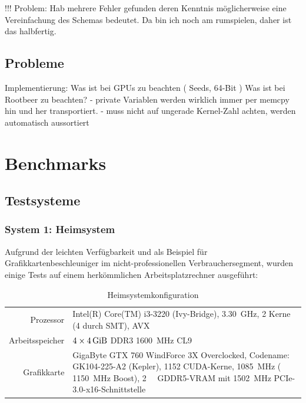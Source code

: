 \documentclass[german,bibnum,beleg,zihtitle,german,hyperref,utf8]{zihpub}
\begin{document}
!!! Problem: Hab mehrere Fehler gefunden deren Kenntnis möglicherweise eine Vereinfachung des Schemas bedeutet. Da bin ich noch am rumspielen, daher ist das halbfertig.

\section{Probleme}
Implementierung:
    Was ist bei GPUs zu beachten ( Seeds, 64-Bit )
    Was ist bei Rootbeer zu beachten?
      - private Variablen werden wirklich immer per memcpy hin und her transportiert.
      - muss nicht auf ungerade Kernel-Zahl achten, werden automatisch aussortiert


\chapter{Benchmarks}
\label{sct:benchmarks}

\section{Testsysteme}
\subsection{System 1: Heimsystem}
\label{sct:system1}

Aufgrund der leichten Verfügbarkeit und als Beispiel für Grafikkartenbeschleuniger im nicht-professionellen Verbrauchersegment, wurden einige Tests auf einem herkömmlichen Arbeitsplatzrechner ausgeführt:

\begin{table}[H]
	\begin{center}\begin{tabularx}{0.9\linewidth}{r|X}
	Prozessor & Intel(R) Core(TM) i3-3220 (Ivy-Bridge), \SI{3.30}{\giga\hertz}, 2 Kerne (4 durch SMT), AVX\cite{ark3220} \\
	Arbeitsspeicher & $4\times \SI{4}{\gibi\byte}$ DDR3 \SI{1600}{\mega\hertz} CL9\cite{corsair4gbddr3}\\
	\hline
	Grafikkarte & GigaByte GTX 760 WindForce 3X Overclocked, Codename: GK104-225-A2 (Kepler), 1152 CUDA-Kerne, \SI{1085}{\mega\hertz} ( \SI{1150}{\mega\hertz} Boost), \SI{2}{\gibi\byte} GDDR5-VRAM mit \SI{1502}{\mega\hertz} PCIe-3.0-x16-Schnittstelle\cite{gigabytegtx760,gtx760,nvidiakepler}
	\end{tabularx}\end{center}
	\caption{Heimsystemkonfiguration}
\end{table}
\end{document}
